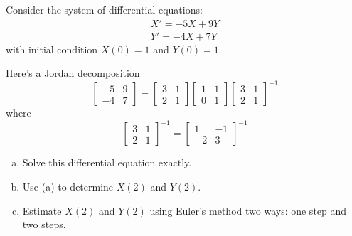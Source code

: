 \documentclass{article}
\newcommand{\inv}{^{-1}}
\begin{document}
\begin{problem}
    Consider the system of differential equations:
    \begin{align*}
        X' = -5X + 9Y\\
        Y' = -4X + 7Y
    \end{align*}
    with initial condition \(X(0) = 1\) and \(Y(0) = 1\).
    
    Here's a Jordan decomposition
    \[\begin{bmatrix}
        -5&9\\
        -4&7
    \end{bmatrix}=
    \begin{bmatrix}
        3&1\\2&1
    \end{bmatrix}
    \begin{bmatrix}
        1&1\\0&1
    \end{bmatrix}
    \begin{bmatrix}
        3&1\\2&1
    \end{bmatrix}\inv\]
    where
    \[
    \begin{bmatrix}
        3&1\\2&1
    \end{bmatrix}\inv=
    \begin{bmatrix}
        1&-1\\-2&3
    \end{bmatrix}\inv\]

    \begin{enumerate}[a)]
        \item Solve this differential equation exactly.
        \item Use (a) to determine \(X(2)\) and \(Y(2)\).
        \item Estimate \(X(2)\) and \(Y(2)\) using Euler's method two ways: one step and two steps.
    \end{enumerate}
\end{problem}
\end{document}
